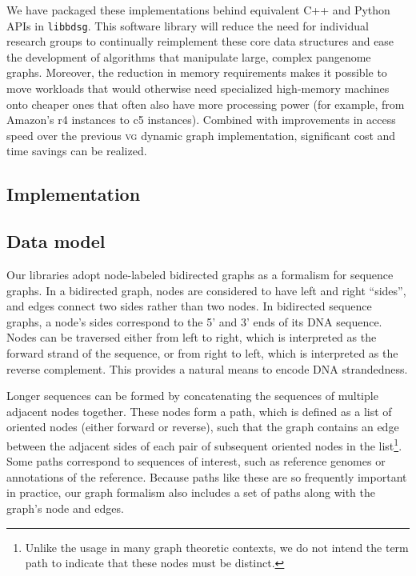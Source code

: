 \documentclass{bioinfo}
\begin{document}
We have packaged these implementations behind equivalent C++ and Python APIs in \texttt{libbdsg}.
This software library will reduce the need for individual research groups to continually reimplement these core data structures and ease the development of algorithms that manipulate large, complex pangenome graphs.
Moreover, the reduction in memory requirements makes it possible to move workloads that would otherwise need specialized high-memory machines onto cheaper ones that often also have more processing power (for example, from Amazon's r4 instances to c5 instances).
Combined with improvements in access speed over the previous \textsc{vg} dynamic graph implementation, significant cost and time savings can be realized.

\begin{methods}

\section{Implementation}

\subsection{Data model}

Our libraries adopt node-labeled bidirected graphs as a formalism for sequence graphs.
In a bidirected graph, nodes are considered to have left and right ``sides'', and edges connect two sides rather than two nodes.
In bidirected sequence graphs, a node's sides correspond to the 5' and 3' ends of its DNA sequence. 
Nodes can be traversed either from left to right, which is interpreted as the forward strand of the sequence, or from right to left, which is interpreted as the reverse complement.
This provides a natural means to encode DNA strandedness.

Longer sequences can be formed by concatenating the sequences of multiple adjacent nodes together.
These nodes form a path, which is defined as a list of oriented nodes (either forward or reverse), such that the graph contains an edge between the adjacent sides of each pair of subsequent oriented nodes in the list\footnote{Unlike the usage in many graph theoretic contexts, we do not intend the term path to indicate that these nodes must be distinct.}.
Some paths correspond to sequences of interest, such as reference genomes or annotations of the reference.
Because paths like these are so frequently important in practice, our graph formalism also includes a set of paths along with the graph's node and edges.


\end{methods}
\end{document}
